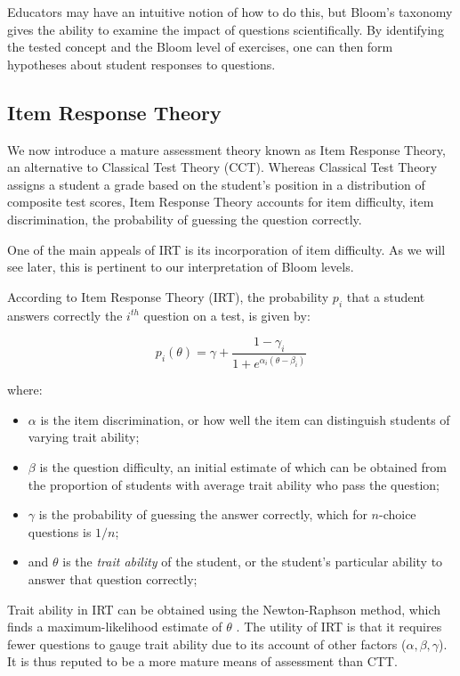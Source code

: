\documentclass[]{interact}
\theoremstyle{plain}
\theoremstyle{definition}
\theoremstyle{remark}
\begin{document}
Educators may have an intuitive notion of how to do this, but Bloom's taxonomy
gives the ability to examine the impact of questions scientifically.  By
identifying the tested concept and the Bloom level of exercises, one can then
form hypotheses about student responses to questions.  


\subsection{Item Response Theory}

We now introduce a mature assessment theory known as Item Response Theory, an
alternative to Classical Test Theory (CCT).  Whereas Classical Test Theory
assigns a student a grade based on the student's position in a distribution of
composite test scores, Item Response Theory accounts for item difficulty,
item discrimination, the probability of guessing the question correctly.

One of the main appeals of IRT is its incorporation of item difficulty.
As we will see later, this is pertinent to our interpretation of Bloom
levels.  

According to Item Response Theory (IRT), the probability $p_i$ that a student
answers correctly the $i^{th}$ question on a test, is given by:

\[
  p_i(\theta) = \gamma + \frac{1-\gamma_i}{1+e^{\alpha_i(\theta-\beta_i)}}
\]

where:

\begin{itemize} 

 \item $\alpha$ is the item discrimination, or how well the item can
 distinguish students of varying trait ability;

 \item $\beta$ is the question difficulty, an initial estimate of which can be
 obtained from the proportion of students with average trait ability who pass
 the question;

 \item $\gamma$ is the probability of guessing the answer correctly,
 which for $n$-choice questions is $1/n$;

 \item and $\theta$ is the \emph{trait ability} of the student, or the
 student's particular ability to answer that question correctly;

\end{itemize} 

Trait ability in IRT can be obtained using the Newton-Raphson method, which
finds a maximum-likelihood estimate of $\theta$ \citep{baker2004}.  The utility
of IRT is that it requires fewer questions to gauge trait ability due to its
account of other factors ($\alpha, \beta, \gamma$). It is thus reputed to be a
more mature means of assessment than CTT.
\end{document}
